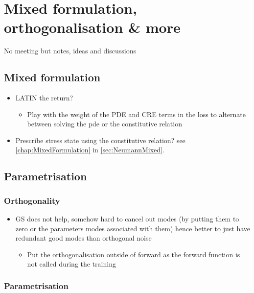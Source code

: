 \chapter[The 5$^{\text{th}}$ of April 2024 - Mixed formulation, orthogonalisation \& mor]{Mixed formulation, orthogonalisation \& more}


\begin{chapabstract}
	No meeting but notes, ideas and discussions
\end{chapabstract}


\minitoc

\section{Mixed formulation}

\begin{itemize}
	\item LATIN the return?
	\begin{itemize}
		\item Play with the weight of the PDE and CRE terms in the loss to alternate between solving the pde or the constitutive relation
	\end{itemize}
	\item Prescribe stress state using the constitutive relation? see \cref{chap:MixedFormulation} in \cref{sec:NeumannMixed}.
\end{itemize}

\section{Parametrisation}

\subsection{Orthogonality}
\begin{itemize}
	\item GS does not help, somehow hard to cancel out modes (by putting them to zero or the parameters modes associated with them) hence better to just have redundant good modes than orthogonal noise
	\begin{itemize}
		\item Put the orthogonalisation outside of forward as the forward function is not called during the training
	\end{itemize}
\end{itemize}

\subsection{Parametrisation}

